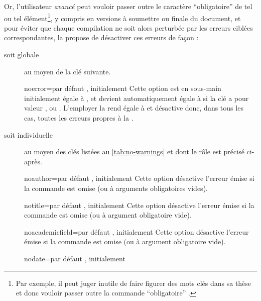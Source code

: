 Or, l'utilisateur \emph{avancé} peut vouloir passer outre le caractère
\enquote{obligatoire} de tel ou tel élément\footnote{Par exemple, il peut juger
  inutile de faire figurer des mots clés dans sa thèse et donc vouloir passer
  outre la commande \enquote{obligatoire} \protect{}.},
y compris en versions à soumettre ou finale du document, et pour éviter que
chaque compilation ne soit alors perturbée par les erreurs ciblées
correspondantes, la \yatcl{} propose de désactiver ces erreurs de façon :
\begin{description}
\item[soit globale] au moyen de la clé  suivante.
  \begin{docKey}{noerror}{=\textbar{}}{par défaut
      , initialement }
    Cette option est en sous-main initialement égale à , et
    devient automatiquement égale à  si la clé 
    a pour valeur ,  ou
    . L'employer la rend égale à  et désactive
    donc, dans tous les cas, toutes les erreurs propres à la \yatcl{}.
  \end{docKey}
\item[soit individuelle] au moyen des clés listées au \vref{tab:no-warnings} et
  dont le rôle est précisé ci-après.
  \begin{docKey}{noauthor}{=\textbar{}}{par défaut
      , initialement }
    Cette option désactive l'erreur émise si la commande  est
    omise (ou à arguments obligatoires vides).
  \end{docKey}
  \begin{docKey}{notitle}{=\textbar{}}{par défaut
      , initialement }
    Cette option désactive l'erreur émise si la commande  est
    omise (ou à argument obligatoire vide).
  \end{docKey}
  \begin{docKey}{noacademicfield}{=\textbar{}}{par
      défaut , initialement }
    Cette option désactive l'erreur émise si la commande 
    est omise (ou à argument obligatoire vide).
  \end{docKey}
  \begin{docKey}{nodate}{=\textbar{}}{par défaut
      , initialement }

\end{docKey}
\end{description}
